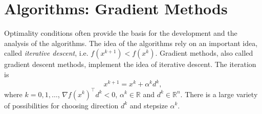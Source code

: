 \documentclass[12pt,a4paper]{article}
\numberwithin{equation}{section}
\theoremstyle{mystyle}
\newcommand{\R}{\mathbb{R}}
\newcommand{\grad}{\nabla}
\newcommand{\T}{\top}
\begin{document}
	\section{Algorithms: Gradient Methods}
	Optimality conditions often provide the basis for the development and the analysis of the algorithms. The idea of the algorithms rely on an important idea, called \emph{iterative descent}, i.e. $f(x^{k+1})<f(x^k)$. Gradient methods, also called gradient descent methods, implement the idea of iterative descent. The iteration is 
	\begin{equation}
		x^{k+1} = x^k + \alpha^k d^k,
	\end{equation}
	where $k=0,1,\dots$, $\grad f(x^k)^\T d^k<0$, $\alpha^k\in \R$ and $d^k\in \R^n$. There is a large variety of possibilities for choosing direction $d^k$ and stepsize $\alpha^k$.
	
\end{document}
